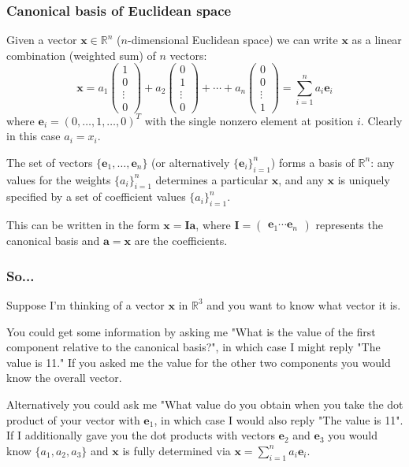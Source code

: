 \documentclass[10pt]{beamer}
\begin{document}
\begin{frame}
  \frametitle{Canonical basis of Euclidean space}
  Given a vector $\mathbf{x} \in \mathbb{R}^n$ ($n$-dimensional Euclidean space) we can write $\mathbf{x}$ as a linear combination (weighted sum) of $n$ vectors:
  \begin{equation*}
    \mathbf{x} = a_1 \begin{pmatrix} 1 \\ 0 \\ \vdots \\ 0 \end{pmatrix} + 
    a_2 \begin{pmatrix} 0 \\ 1 \\ \vdots \\ 0 \end{pmatrix} + \cdots + 
    a_n \begin{pmatrix} 0 \\ 0 \\ \vdots \\ 1 \end{pmatrix} = \sum_{i=1}^n a_i \mathbf{e}_i
  \end{equation*}
  where $\mathbf{e}_i = (0, \ldots, 1, \ldots, 0)^T$ with the single nonzero element at position $i$.  Clearly in this case $a_i = x_i$.  
  
  The set of vectors $\{\mathbf{e}_1, \ldots, \mathbf{e}_n\}$ (or alternatively $\{\mathbf{e}_i\}_{i=1}^n$) forms a basis of $\mathbb{R}^n$: any values for the weights $\{a_i\}_{i=1}^n$ determines a particular $\mathbf{x}$, and any $\mathbf{x}$ is uniquely specified by a set of coefficient values $\{a_i\}_{i=1}^n$.  

  This can be written in the form $\mathbf{x} = \mathbf{I} \mathbf{a}$, where $\mathbf{I} = \begin{pmatrix} \mathbf{e}_1 \cdots \mathbf{e}_n \end{pmatrix}$ represents the canonical basis and $\mathbf{a} = \mathbf{x}$ are the coefficients.
\end{frame}

\begin{frame}
  \frametitle{So...}
  
  Suppose I'm thinking of a vector $\mathbf{x}$ in $\mathbb{R}^3$ and you want to know what vector it is.
  
  You could get some information by asking me  "What is the value of the first component relative to the canonical basis?", in which case I might reply "The value is 11."  If you asked me the value for the other two components you would know the overall vector.
  
  Alternatively you could ask me "What value do you obtain when you take the dot product of your vector with $\mathbf{e}_1$, in which case I would also reply "The value is 11".  If I additionally gave you the dot products with vectors $\mathbf{e}_2$ and $\mathbf{e}_3$ you would know $\{a_1, a_2, a_3\}$ and $\mathbf{x}$ is fully determined via $\mathbf{x} = \sum_{i=1}^n a_i \mathbf{e}_i$.  
  \end{frame}
\end{document}
